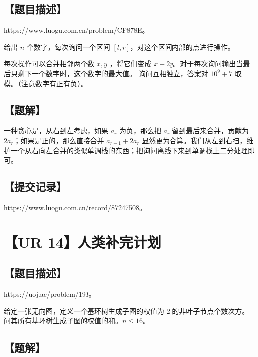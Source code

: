 \documentclass[UTF8,12pt,a4paper]{ctexart}
\begin{document}
	\subsection*{【题目描述】}
	
	https://www.luogu.com.cn/problem/CF878E。
	
	给出 $n$ 个数字，每次询问一个区间 $[l,r]$，对这个区间内部的点进行操作。 
	
	每次操作可以合并相邻两个数 $x,y$ ，将它们变成 $x+2y$。对于每次询问输出当最后只剩下一个数字时，这个数字的最大值。 
	询问互相独立，答案对 $10^9+7$ 取模。（注意数字有正有负）。
	
	\subsection*{【题解】}
	
	一种贪心是，从右到左考虑，如果 $a_r$ 为负，那么把 $a_r$ 留到最后来合并，贡献为 $2a_r$；如果是正的，那么直接合并 $a_{r-1}+2a_r$ 显然更为合算。我们从左到右扫，维护一个从右向左合并的类似单调栈的东西；把询问离线下来到单调栈上二分处理即可。
	
	\subsection*{【提交记录】}
	
	https://www.luogu.com.cn/record/87247508。
	
	
	\section*{【UR 14】人类补完计划}
	
	\subsection*{【题目描述】}
	
	https://uoj.ac/problem/193。
	
	给定一张无向图，定义一个基环树生成子图的权值为 $2$ 的非叶子节点个数次方。问其所有基环树生成子图的权值的和。$n\le 16$。
	
	\subsection*{【题解】}
	
\end{document}
